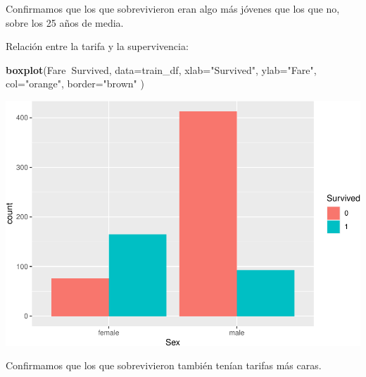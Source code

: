 \documentclass[]{article}
\newenvironment{Shaded}{\begin{snugshade}}{\end{snugshade}}
\newcommand{\DataTypeTok}[1]{\textcolor[rgb]{0.13,0.29,0.53}{#1}}
\newcommand{\KeywordTok}[1]{\textcolor[rgb]{0.13,0.29,0.53}{\textbf{#1}}}
\newcommand{\NormalTok}[1]{#1}
\newcommand{\OperatorTok}[1]{\textcolor[rgb]{0.81,0.36,0.00}{\textbf{#1}}}
\newcommand{\StringTok}[1]{\textcolor[rgb]{0.31,0.60,0.02}{#1}}
\begin{document}
Confirmamos que los que sobrevivieron eran algo más jóvenes que los que
no, sobre los 25 años de media.

Relación entre la tarifa y la supervivencia:

\begin{Shaded}
\begin{Highlighting}[]
\KeywordTok{boxplot}\NormalTok{(Fare}\OperatorTok{~}\NormalTok{Survived,}
\DataTypeTok{data=}\NormalTok{train_df,}
\DataTypeTok{xlab=}\StringTok{"Survived"}\NormalTok{,}
\DataTypeTok{ylab=}\StringTok{"Fare"}\NormalTok{,}
\DataTypeTok{col=}\StringTok{"orange"}\NormalTok{,}
\DataTypeTok{border=}\StringTok{"brown"}
\NormalTok{)}
\end{Highlighting}
\end{Shaded}

\includegraphics{titanic_data_analysis_PRA2_files/figure-latex/unnamed-chunk-28-1.pdf}

Confirmamos que los que sobrevivieron también tenían tarifas más caras.
\end{document}
